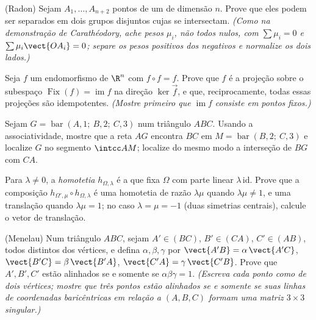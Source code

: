 \begin{exercise}[$\star\star\star$]\label{exo:b2:affine:7}
(Radon) Sejam $A_1, \dots, A_{n+2}$ pontos de um  de
dimensão $n$. Prove que eles podem ser separados em dois grupos
disjuntos cujas  se intersectam. \emph{(Como na
demonstração de Carathéodory, ache pesos $\mu_i$, não todos nulos, com $\sum\mu_i = 0$ e
$\sum\mu_i\vect{OA_i} = 0$; separe os pesos positivos dos negativos
e normalize os dois lados.)}
\end{exercise}

\begin{exercise}[$\star\star\star$]\label{exo:b2:affine:8}
Seja $f$ um endomorfismo  de $\R^n$ com $f \circ f = f$.
Prove que $f$ é a projeção  sobre o subespaço 
$\operatorname{Fix}(f) = \operatorname{im} f$ na direção
$\ker\vec f$, e que, reciprocamente, todas essas projeções são
idempotentes. \emph{(Mostre primeiro que $\operatorname{im} f$ consiste
em pontos fixos.)}
\end{exercise}

\begin{exercise}[$\star$]\label{exo:b2:affine:9}
Sejam $G = \operatorname{bar}(A, 1;\ B, 2;\ C, 3)$ num triângulo
$ABC$. Usando a associatividade, mostre que a reta $AG$ encontra $BC$
em $M = \operatorname{bar}(B, 2;\ C, 3)$ e localize $G$ no
segmento $\intcc AM$; localize do mesmo modo a interseção de $BG$
com $CA$.
\end{exercise}

\begin{exercise}[$\star\star$]\label{exo:b2:affine:10}
Para $\lambda \neq 0$, a \emph{homotetia} $h_{\Omega,
\lambda}$ é a  que fixa $\Omega$ com parte linear
$\lambda\,\mathrm{id}$. Prove que a composição
$h_{\Omega', \mu} \circ h_{\Omega, \lambda}$ é uma homotetia de
razão $\lambda\mu$ quando $\lambda\mu \neq 1$, e uma translação
quando $\lambda\mu = 1$; no caso $\lambda = \mu = -1$ (duas
simetrias centrais), calcule o vetor de translação.
\end{exercise}

\begin{exercise}[$\star\star$]\label{exo:b2:affine:11}
(Menelau) Num triângulo $ABC$, sejam $A' \in (BC)$, $B' \in
(CA)$, $C' \in (AB)$, todos distintos dos vértices, e
defina $\alpha, \beta, \gamma$ por $\vect{A'B} =
\alpha\,\vect{A'C}$, $\vect{B'C} = \beta\,\vect{B'A}$,
$\vect{C'A} = \gamma\,\vect{C'B}$. Prove que $A', B', C'$ estão
alinhados se e somente se $\alpha\beta\gamma = 1$. \emph{(Escreva
cada ponto como  de dois vértices; mostre que três
pontos estão alinhados se e somente se suas linhas de coordenadas baricêntricas
em relação a $(A, B, C)$ formam uma matriz $3 \times 3$ singular.)}
\end{exercise}

